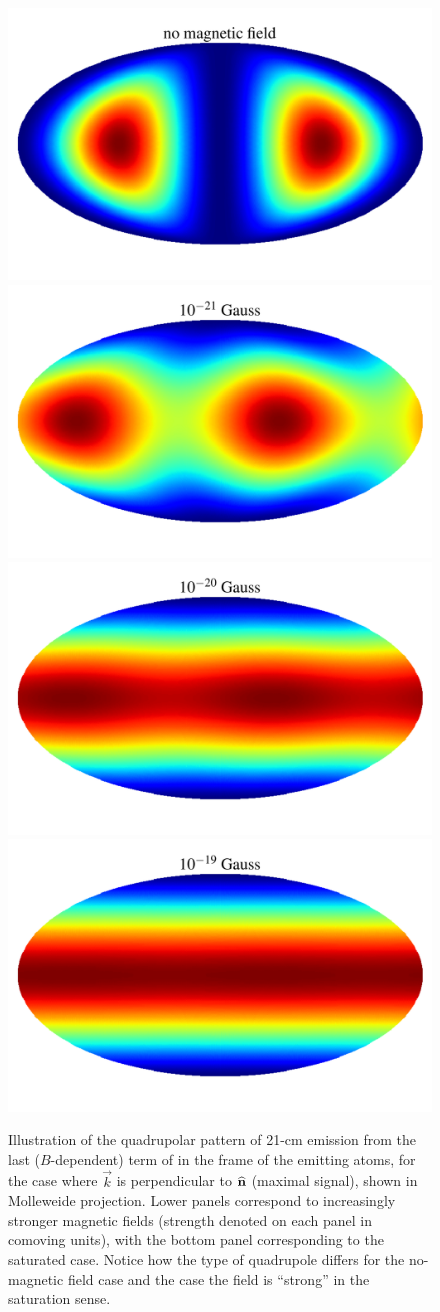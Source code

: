 \begin{figure}
\centering
\includegraphics[width=.35\textwidth,keepaspectratio=true]{hp_B_0e+00G.pdf}
\includegraphics[width=.35\textwidth,keepaspectratio=true]{hp_B_1e-18G.pdf}
\includegraphics[width=.35\textwidth,keepaspectratio=true]{hp_B_1e-17G.pdf}
\includegraphics[width=.35\textwidth,keepaspectratio=true]{hp_B_1e-16G.pdf}
\caption{Illustration of the quadrupolar pattern of 21-cm emission from the last ($B$-dependent) term of \eq{\ref{eq:tbsoln}} in the frame of the emitting atoms, for the case where $\vec k$ is perpendicular to ${\bf{\widehat n}}$ (maximal signal), shown in Molleweide projection. Lower panels correspond to increasingly stronger magnetic fields (strength denoted on each panel in comoving units), with the bottom panel corresponding to the saturated case. Notice how the type of quadrupole differs for the no-magnetic field case and the case the field is ``strong'' in the saturation sense. \label{fig:hp}}
\end{figure}


